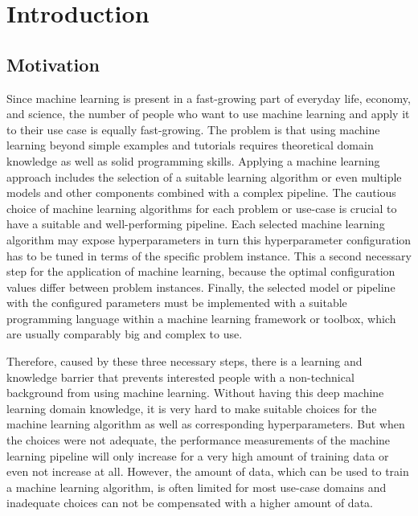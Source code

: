 %
\chapter{Introduction}
\label{sec:intro}

\section{Motivation}
\label{sec:intro:motivation}

Since machine learning is present in a fast-growing part of everyday life, economy, and science, the number of people who want to use machine learning and apply it to their use case is equally fast-growing.
The problem is that using machine learning beyond simple examples and tutorials requires theoretical domain knowledge as well as solid programming skills.\newline
Applying a machine learning approach includes the selection of a suitable learning algorithm or even multiple models and other components combined with a complex pipeline.
The cautious choice of machine learning algorithms for each problem or use-case is crucial to have a suitable and well-performing pipeline.\newline
Each selected machine learning algorithm may expose hyperparameters in turn this hyperparameter configuration has to be tuned in terms of the specific problem instance.
This a second necessary step for the application of machine learning, because the optimal configuration values differ between problem instances.\newline
Finally, the selected model or pipeline with the configured parameters must be implemented with a suitable programming language within a machine learning framework or toolbox, which are usually comparably big and complex to use.

Therefore, caused by these three necessary steps, there is a learning and knowledge barrier that prevents interested people with a non-technical background from using machine learning.
Without having this deep machine learning domain knowledge, it is very hard to make suitable choices for the machine learning algorithm as well as corresponding hyperparameters.\newline
But when the choices were not adequate, the performance measurements of the machine learning pipeline will only increase for a very high amount of training data or even not increase at all.
However, the amount of data, which can be used to train a machine learning algorithm, is often limited for most use-case domains and inadequate choices can not be compensated with a higher amount of data.

